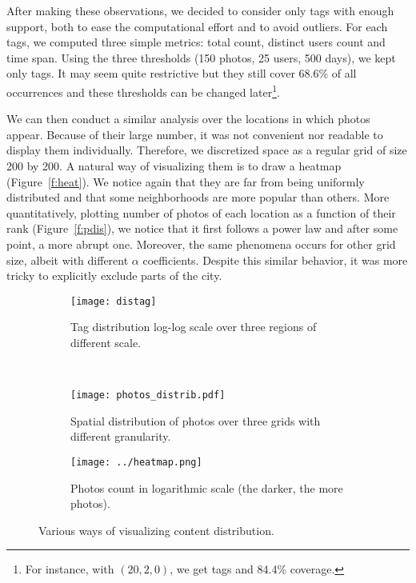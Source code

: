 After making these observations, we decided to consider only tags with enough
support, both to ease the computational effort and to avoid outliers. For each
tags, we computed three simple metrics: total count, distinct users count and
time span. Using the three thresholds (150 photos, 25 users, 500 days), we
kept only  tags. It may seem quite restrictive but they still
cover 68.6\% of all occurrences and these thresholds can be changed
later\footnote{For instance, with $(20, 2, 0)$, we get  tags
and 84.4\% coverage.}.

We can then conduct a similar analysis over the locations in which photos
appear. Because of their large number, it was not convenient nor readable to
display them individually. Therefore, we discretized space as a regular grid
of size 200 by 200. A natural way of visualizing them is to draw a heatmap
(Figure~\vref{f:heat}).  We notice again that they are far from being
uniformly distributed and that some neighborhoods are more popular than
others. More quantitatively, plotting number of photos of each location as a
function of their rank (Figure~\vref{f:pdis}), we notice that it first follows
a power law and after some point, a more abrupt one. Moreover, the same
phenomena occurs for other grid size, albeit with different $\alpha$
coefficients. Despite this similar behavior, it was more tricky to explicitly
exclude parts of the city.

\clearpage
{}
\thispagestyle{empty}
\begin{figure}[p]
        \centering
		\begin{subfigure}[b]{0.5\textwidth}
			\texttt{[image: distag]}
			\caption{Tag distribution log-log scale over three regions of
			different scale.\label{f:tags}}
		\end{subfigure}~
        \begin{subfigure}[b]{0.5\textwidth}
			\texttt{[image: photos\_distrib.pdf]}
			\caption{Spatial distribution of photos over three grids with
			different granularity.\label{f:pdis}}
        \end{subfigure}

		\begin{subfigure}[b]{\textwidth}
			\centering
			\texttt{[image: ../heatmap.png]}
			\caption{Photos count in logarithmic scale (the darker, the more
			photos).\label{f:heat}}
		\end{subfigure}
		\caption{Various ways of visualizing content distribution.\label{f:distrib}}
\end{figure}
\restoregeometry

